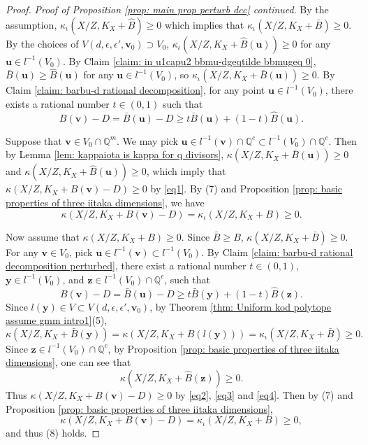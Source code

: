 \documentclass[11pt]{amsart}
\numberwithin{equation}{section}
\newcommand{\Qq}{\mathbb{Q}}
\theoremstyle{definition}
\theoremstyle{definition}
\begin{document}
\begin{proof}
\noindent\textit{Proof of Proposition \ref{prop: main prop perturb dcc} continued}. 
By the assumption, $\kappa_{\iota}(X/Z,K_X+\widehat B)\geq 0$ which implies that $\kappa_{\iota}(X/Z,K_X+\bar B)\geq 0$. By the choices of $V(d,\epsilon,\epsilon',\bm{v}_0)\supset V_0$, $\kappa_{\iota}(X/Z,K_X+\widehat B(\bm{u}))\geq 0$ for any $\bm{u}\in l^{-1}(V_0)$. By Claim \ref{claim: in u1capu2 bbmu-dgeqtilde bbmugeq 0}, $\bar B(\bm{u})\geq\widehat B(\bm{u})$ for any $\bm{u}\in l^{-1}(V_0)$, so $\kappa_{\iota}(X/Z,K_X+\bar B(\bm{u}))\geq 0$. By Claim \ref{claim: barbu-d rational decomposition}, for any point $\bm{u}\in l^{-1}(V_0)$, there exists a rational number $t\in (0,1)$ such that 
\begin{equation}\label{eq1}
B(\bm{v})-D=\bar B(\bm{u})-D\geq t\bar B(\bm{u})+(1-t)\widehat B(\bm{u}).
\end{equation}

Suppose that $\bm{v}\in V_0\cap\Qq^m$. We may pick $\bm{u}\in l^{-1}(\bm{v})\cap\Qq^c\subset l^{-1}(V_0)\cap\Qq^c$. Then by Lemma \ref{lem: kappaiota is kappa for q divisors}, $\kappa(X/Z,K_X+\bar B(\bm{u}))\geq 0$ and $\kappa(X/Z,K_X+\widehat B(\bm{u}))\geq 0$, which imply that $\kappa(X/Z,K_X+B(\bm{v})-D)\geq 0$ by \eqref{eq1}. By (7) and Proposition \ref{prop: basic properties of three iitaka dimensions}, we have
$$\kappa(X/Z,K_X+B(\bm{v})-D)=\kappa_{\iota}(X/Z,K_X+B)\geq 0.$$

Now assume that $\kappa(X/Z,K_X+B)\geq 0$. Since $\bar B\geq B$, $\kappa(X/Z,K_X+\bar B)\geq 0$. For any $\bm{v}\in V_0$, pick $\bm{u}\in l^{-1}(\bm{v})\subset l^{-1}(V_0)$. By Claim \ref{claim: barbu-d rational decomposition perturbed}, there exist a rational number $t\in (0,1)$, $\bm{y}\in l^{-1}(V_0)$, and $\bm{z}\in l^{-1}(V_0)\cap\Qq^c$, such that
\begin{equation}\label{eq2}
    B(\bm{v})-D=\bar B(\bm{u})-D\geq t\bar B(\bm{y})+(1-t)\widehat B(\bm{z}).
\end{equation}
Since $l(\bm{y})\in V\subset V(d,\epsilon,\epsilon',\bm{v}_0)$, by Theorem \ref{thm: Uniform kod polytope assume gmm intro1}(5), \begin{equation}\label{eq3}
\kappa(X/Z,K_X+\bar B(\bm{y}))=\kappa(X/Z,K_X+B(l(\bm{y})))=\kappa_{\iota}(X/Z,K_X+\bar{B})\geq 0.
\end{equation}
Since $\bm{z}\in l^{-1}(V_0)\cap\Qq^c$, by Proposition \ref{prop: basic properties of three iitaka dimensions}, one can see that
\begin{equation}\label{eq4}
\kappa(X/Z,K_X+\widehat B(\bm{z}))\geq 0.
\end{equation}
Thus $\kappa(X/Z,K_X+B(\bm{v})-D)\geq 0$ by \eqref{eq2}, \eqref{eq3} and \eqref{eq4}. Then by (7) and Proposition \ref{prop: basic properties of three iitaka dimensions}, 
$$\kappa(X/Z,K_X+B(\bm{v})-D)=\kappa_{\iota}(X/Z,K_X+B)\geq 0,$$
and thus (8) holds.
\end{proof}
\end{document}
